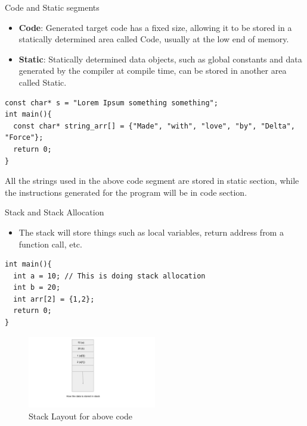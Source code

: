 \documentclass[
  10pt,
  ignorenonframetext,
]{beamer}
\providecommand{\tightlist}{%
  \setlength{\itemsep}{0pt}\setlength{\parskip}{0pt}}
\begin{document}
\begin{frame}[fragile]{Code and Static segments}
\protect\hypertarget{code-and-static-segments}{}
\begin{itemize}
\tightlist
\item
  \textbf{Code}: Generated target code has a fixed
  size, allowing it to be stored in a statically
  determined area called Code, usually at the low
  end of memory.
\end{itemize}

\pause

\begin{itemize}
\tightlist
\item
  \textbf{Static}: Statically determined data
  objects, such as global constants and data
  generated by the compiler at compile time, can
  be stored in another area called Static.
\end{itemize}

\pause

\scriptsize

\begin{verbatim}
const char* s = "Lorem Ipsum something something";
int main(){
  const char* string_arr[] = {"Made", "with", "love", "by", "Delta", "Force"};
  return 0;
}
\end{verbatim}

\normalsize

All the strings used in the above code segment are
stored in static section, while the instructions
generated for the program will be in code section.
\end{frame}

\begin{frame}[fragile]{Stack and Stack Allocation}
\protect\hypertarget{stack-and-stack-allocation}{}
\begin{itemize}
\tightlist
\item
  The stack will store things such as local
  variables, return address from a function call,
  etc.
\end{itemize}

\scriptsize

\begin{verbatim}
int main(){
  int a = 10; // This is doing stack allocation
  int b = 20;
  int arr[2] = {1,2};
  return 0;
}
\end{verbatim}

\normalsize

\begin{figure}
\centering
\includegraphics[width=0.5\textwidth,height=\textheight]{stack_layout.png}
\caption{Stack Layout for above code}
\end{figure}
\end{frame}
\end{document}
